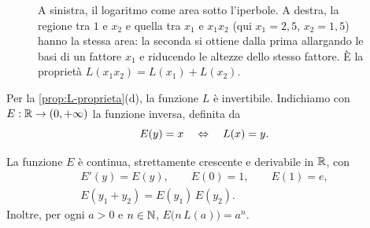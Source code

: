 \begin{figure}[htb]
\centering
{}
\caption{A sinistra, il logaritmo come area sotto l'iperbole. A destra, la regione tra
$1$ e $x_{2}$ e quella tra $x_{1}$ e $x_{1}x_{2}$ (qui $x_{1}=2{,}5$, $x_{2}=1{,}5$) hanno la stessa area: la
seconda si ottiene dalla prima allargando le basi di un fattore $x_{1}$ e riducendo le
altezze dello stesso fattore. È la proprietà $L(x_{1}x_{2})=L(x_{1})+L(x_{2})$.}
\label{fig:logaritmo-area}
\end{figure}

Per la \cref{prop:L-proprieta}(d), la funzione $L$ è invertibile. Indichiamo con
$E:\mathbb{R}\to(0,+\infty)$ la funzione inversa, definita da
\begin{equation}\label{eq:E-definizione}
  E(y)=x \quad\Leftrightarrow\quad L(x)=y .
\end{equation}

\begin{proposizione}\label{prop:E-proprieta}
La funzione $E$ è continua, strettamente crescente e derivabile in $\mathbb{R}$, con
\begin{equation}\label{eq:E-proprieta}
\begin{gathered}
  E'(y)=E(y), \qquad E(0)=1, \qquad E(1)=e,\\
  E(y_{1}+y_{2})=E(y_{1})\,E(y_{2}) .
\end{gathered}
\end{equation}
Inoltre, per ogni $a>0$ e $n\in\mathbb{N}$, $E\bigl(n\,L(a)\bigr)=a^{n}$.
\end{proposizione}

